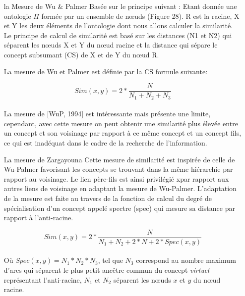   \renewcommand{\descriptionlabel}[1]{\hspace{1cm}\textbullet~\textsf{#1}}
  \begin{itemize}
  \item [la Mesure de Wu \& Palmer] Basée sur le principe suivant :
    Etant donnée une ontologie $\Pi$ formée par un ensemble de nœuds
    (Figure 28). R est la racine, X et Y les deux éléments de
    l’ontologie dont nous allons calculer la similarité. Le principe
    de calcul de similarité est basé sur les distances (N1 et N2) qui
    séparent les nœuds X et Y du nœud racine et la distance qui sépare
    le concept subsumant (CS) de X et de Y du nœud R.

    La mesure de Wu et Palmer est définie par la CS formule suivante:

    \begin{equation}
      \label{wu_palmer}
      Sim(x,y) = 2 *  \frac{N}{N_{1} + N_{2} + N_{3}}
    \end{equation}\\

    La mesure de [WuP, 1994] est intéressante mais présente une
    limite, cependant, avec cette mesure on peut obtenir une
    similarité plus élevée entre un concept et son voisinage par
    rapport à ce même concept et un concept fils, ce qui est inadéquat
    dans le cadre de la recherche de l’information.\\

  \item [La mesure de Zargayouna]
    Cette mesure de similarité est inspirée de celle de Wu-Palmer
    favorisant les concepts se trouvant dans la même hiérarchie par
    rapport au voisinage. Le lien père-fils est ainsi privilégié xpar
    rapport aux autres liens de voisinage en adaptant la mesure de
    Wu-Palmer. L'adaptation de la mesure est faite au travers de la
    fonction de calcul du degré de spécialisation d'un concept appelé
    spectre (spec) qui mesure sa distance par rapport à l'anti-racine.

    \begin{equation}
      \label{zargayouna}
      Sim(x,y)= 2 * \frac{N}{N_{1} + N_{2} + 2 * N + 2 * Spec(x,y)}
    \end{equation}\\

    Où $Spec(x,y)=N_{1}*N_{2} *N_{3}$, tel que $N_{3}$ correspond au
    nombre maximum d'arcs qui séparent le plus petit ancêtre commun du
    concept \textit{virtuel} représentant l'anti-racine, $N_{1}$ et
    $N_{2}$ séparent les nœuds $x$ et $y$ du nœud racine.\\
  \end{itemize}

